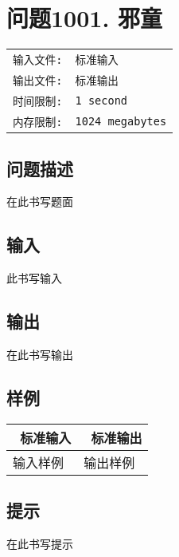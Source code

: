 \documentclass{article}
\begin{document}
\newpage
\section*{\textsf{问题1001. }\textrm{邪童}}
\begin{tabular}{ll}
    \fontsize{10pt}{10pt}\texttt{输入文件:}   & \fontsize{10pt}{10pt}\texttt{标准输入}  \\
    \fontsize{10pt}{10pt}\texttt{输出文件:}  & \fontsize{10pt}{10pt}\texttt{标准输出} \\
    \fontsize{10pt}{10pt}\texttt{时间限制:}   & \fontsize{10pt}{10pt}\texttt{1 second}  \\
    \fontsize{10pt}{10pt}\texttt{内存限制:}  & \fontsize{10pt}{10pt}\texttt{1024 megabytes} \\
\end{tabular}
\subsection*{\textsf{问题描述}}
在此书写题面
\subsection*{\textsf{输入}}
此书写输入
\subsection*{\textsf{输出}}
在此书写输出

\noindent
\subsection*{\textsf{样例}}
\noindent
\begin{tabular}{| p{7cm} | p{7cm} |}
    \hline
    {\quad\quad\quad\quad\quad\quad\quad\  标准输入} & {\quad\quad\quad\quad\quad\quad\quad\  标准输出} \\ 
    \hline
    输入样例 & 输出样例 \\
    \hline
\end{tabular}

\subsection*{\textsf{提示}}
在此书写提示
\end{document}

